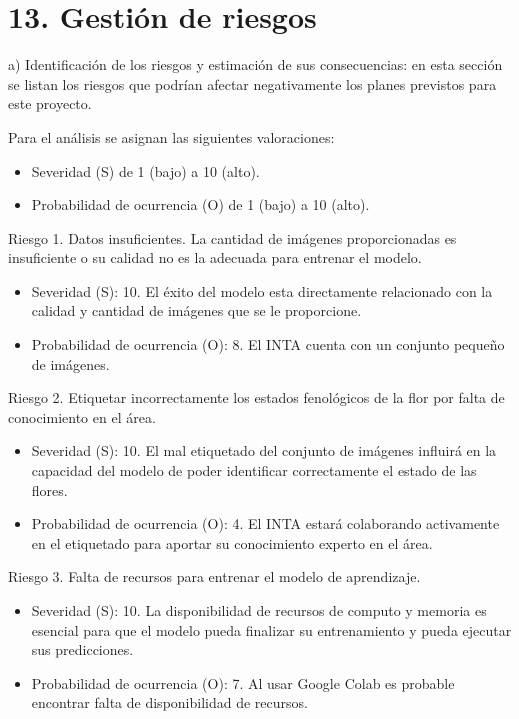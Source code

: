 \documentclass[
11pt, %
codirector, %
]{charter}
\begin{document}
\section{13. Gestión de riesgos}
\label{sec:riesgos}

a) Identificación de los riesgos y estimación de sus consecuencias: en esta sección se listan los riesgos que podrían afectar negativamente los planes previstos para este proyecto.

Para el análisis se asignan las siguientes valoraciones:

\begin{itemize}
\item Severidad (S) de 1 (bajo) a 10 (alto).
\item Probabilidad de ocurrencia (O) de 1 (bajo) a 10 (alto).
\end{itemize}

Riesgo 1. Datos insuficientes. La cantidad de imágenes proporcionadas es insuficiente o su calidad no es la adecuada para entrenar el modelo.

\begin{itemize}
\item Severidad (S): 10. El éxito del modelo esta directamente relacionado con la calidad y cantidad de imágenes que se le proporcione. 

\item Probabilidad de ocurrencia (O): 8. El INTA cuenta con un conjunto pequeño de imágenes. 
\end{itemize}

Riesgo 2. Etiquetar incorrectamente los estados fenológicos de la flor por falta de conocimiento en el área.

\begin{itemize}
\item Severidad (S): 10. El mal etiquetado del conjunto de imágenes influirá en la capacidad del modelo de poder identificar correctamente el estado de las flores. 

\item Probabilidad de ocurrencia (O): 4. El INTA estará colaborando activamente en el etiquetado para aportar su conocimiento experto en el área. 
\end{itemize}

Riesgo 3. Falta de recursos para entrenar el modelo de aprendizaje.

\begin{itemize}
\item Severidad (S): 10. La disponibilidad de recursos de computo y memoria es esencial para que el modelo pueda finalizar su entrenamiento y pueda ejecutar sus predicciones. 

\item Probabilidad de ocurrencia (O): 7. Al usar Google Colab es probable encontrar falta de disponibilidad de recursos. 
\end{itemize}
\end{document}
